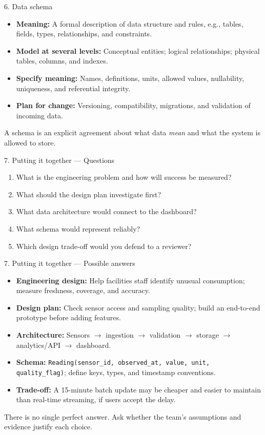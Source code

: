 \documentclass[11pt,aspectratio=43]{beamer}
\begin{document}
\begin{frame}{6. Data schema}
\begin{itemize}
  \item \textbf{Meaning:} A formal description of data structure and rules, e.g., tables, fields, types, relationships, and constraints.
  \item \textbf{Model at several levels:} Conceptual entities; logical relationships; physical tables, columns, and indexes.
  \item \textbf{Specify meaning:} Names, definitions, units, allowed values, nullability, uniqueness, and referential integrity.
  \item \textbf{Plan for change:} Versioning, compatibility, migrations, and validation of incoming data.
\end{itemize}
\begin{block}{}
A schema is an explicit agreement about what data \emph{mean} and what the system is allowed to store.
\end{block}
\end{frame}

\begin{frame}{7. Putting it together --- Questions}
\begin{enumerate}
  \item What is the engineering problem and how will success be measured?
  \item What should the design plan investigate first?
  \item What data architecture would connect to the dashboard?
  \item What schema would represent reliably?
  \item Which design trade-off would you defend to a reviewer?
\end{enumerate}
\end{frame}

\begin{frame}{7. Putting it together --- Possible answers}
\small
\begin{itemize}
  \item \textbf{Engineering design:} Help facilities staff identify unusual consumption; measure freshness, coverage, and accuracy.
  \item \textbf{Design plan:} Check sensor access and sampling quality; build an end-to-end prototype before adding features.
  \item \textbf{Architecture:} Sensors $\rightarrow$ ingestion $\rightarrow$ validation $\rightarrow$ storage $\rightarrow$ analytics/API $\rightarrow$ dashboard.
  \item \textbf{Schema:} \texttt{Reading(sensor\_id, observed\_at, value, unit, quality\_flag)}; define keys, types, and timestamp conventions.
  \item \textbf{Trade-off:} A 15-minute batch update may be cheaper and easier to maintain than real-time streaming, if users accept the delay.
\end{itemize}
\begin{block}{}
There is no single perfect answer. Ask whether the team's assumptions and evidence justify each choice.
\end{block}
\end{frame}
\end{document}
